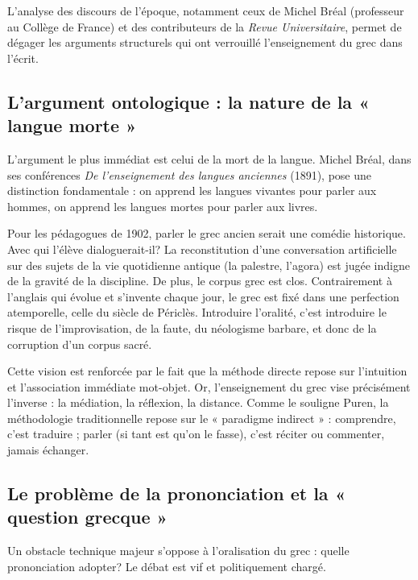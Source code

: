 L'analyse des discours de l'époque, notamment ceux de Michel Bréal (professeur au Collège de France)
et des contributeurs de la \textit{Revue Universitaire}, permet de dégager les arguments structurels
qui ont verrouillé l'enseignement du grec dans l'écrit.



\subsection{L'argument ontologique : la nature de la « langue morte »}

L'argument le plus immédiat est celui de la mort de la langue. Michel Bréal, dans ses conférences
\textit{De l'enseignement des langues anciennes} (1891), pose une distinction fondamentale : on
apprend les langues vivantes pour parler aux hommes, on apprend les langues mortes pour parler aux
livres.\cite{I-2-2-ref9}

Pour les pédagogues de 1902, \og parler\fg{} le grec ancien serait une comédie historique. Avec qui
l'élève dialoguerait-il? La reconstitution d'une conversation artificielle sur des sujets de la vie
quotidienne antique (la palestre, l'agora) est jugée indigne de la gravité de la discipline. De
plus, le corpus grec est clos. Contrairement à l'anglais qui évolue et s'invente chaque jour, le
grec est fixé dans une perfection atemporelle, celle du siècle de Périclès. Introduire l'oralité,
c'est introduire le risque de l'improvisation, de la faute, du néologisme barbare, et donc de la
corruption d'un corpus sacré.

Cette vision est renforcée par le fait que la méthode directe repose sur l'intuition et
l'association immédiate mot-objet. Or, l'enseignement du grec vise précisément l'inverse : la
médiation, la réflexion, la distance. Comme le souligne Puren, la méthodologie traditionnelle repose
sur le « paradigme indirect » : comprendre, c'est traduire ; parler (si tant est qu'on le fasse),
c'est réciter ou commenter, jamais échanger.\cite{I-2-2-ref11}



\subsection{Le problème de la prononciation et la « question grecque »}

Un obstacle technique majeur s'oppose à l'oralisation du grec : quelle prononciation adopter? Le
débat est vif et politiquement chargé.

